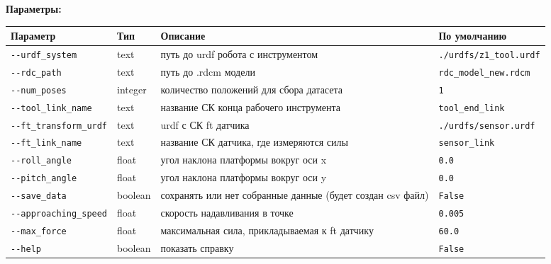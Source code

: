 \textbf{Параметры:}
\begin{center}
\fontsize{10pt}{10pt}\selectfont
\begin{longtable}[]{p{5cm}|p{2cm}|p{3.5cm}|p{5cm}}
    \hline
\toprule()
Параметр & Тип & Описание & По умолчанию \\
\hline
\midrule()
\endhead
\texttt{-\/-urdf\_system} & text & путь до urdf робота с инструментом
&
\texttt{./urdfs/z1\_tool.urdf} \\
\hline
\texttt{-\/-rdc\_path} & text & путь до .rdcm модели &
\texttt{rdc\_model\_new.rdcm} \\
\hline
\texttt{-\/-num\_poses} & integer & количество положений для сбора датасета &
\texttt{1} \\
\hline
\texttt{-\/-tool\_link\_name} & text & название СК конца рабочего инструмента &
\texttt{tool\_end\_link} \\
\hline
\texttt{-\/-ft\_transform\_urdf} & text & urdf с СК ft датчика &
\texttt{./urdfs/sensor.urdf} \\
\hline
\texttt{-\/-ft\_link\_name} & text & название СК датчика, где измеряются силы &
\texttt{sensor\_link} \\
\hline
\texttt{-\/-roll\_angle} & float & угол наклона платформы вокруг оси x & \texttt{0.0} \\
\hline
\texttt{-\/-pitch\_angle} & float & угол наклона платформы вокруг оси y & \texttt{0.0} \\
\hline
\texttt{-\/-save\_data} & boolean & сохранять или нет собранные данные (будет создан csv файл) & \texttt{False} \\
\hline
\texttt{-\/-approaching\_speed} & float & скорость надавливания в точке & \texttt{0.005} \\
\hline
\texttt{-\/-max\_force} & float & максимальная сила, прикладываемая к ft датчику &
\texttt{60.0} \\
\hline
\texttt{-\/-help} & boolean & показать справку &
\texttt{False} \\
\bottomrule()
\hline
\end{longtable}
\end{center}
